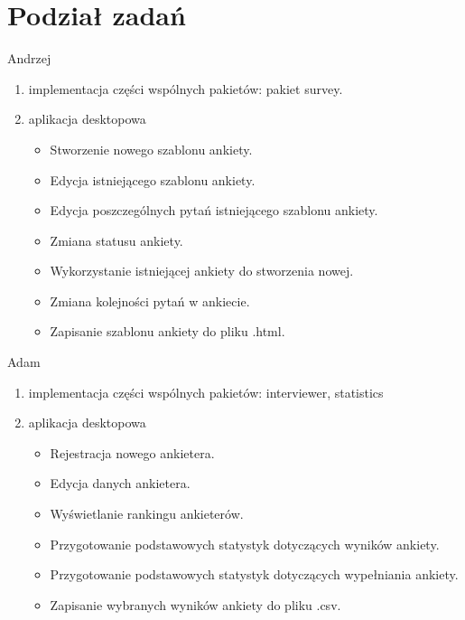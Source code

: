 \documentclass[a4paper,10pt]{beamer}
\begin{document}
		\section{Podział zadań}
		
		\begin{frame}{Andrzej}
			\begin{enumerate}
				\item	implementacja części wspólnych pakietów: pakiet survey.
				\item	aplikacja desktopowa
				\begin{itemize}
					\item  	Stworzenie nowego szablonu ankiety. 
						\item	Edycja istniejącego szablonu ankiety.
						\item	Edycja poszczególnych pytań istniejącego szablonu ankiety.
						\item	Zmiana statusu ankiety.
						\item	Wykorzystanie istniejącej ankiety do stworzenia nowej.
						\item	Zmiana kolejności pytań w ankiecie.
						\item	Zapisanie szablonu ankiety do pliku .html.
				\end{itemize}
			\end{enumerate}
		\end{frame}
		
		\begin{frame}{Adam}
			\begin{enumerate}
				\item	implementacja części wspólnych pakietów: interviewer, statistics
				\item	aplikacja desktopowa	
				\begin{itemize}
					\item Rejestracja nowego ankietera.
					\item	Edycja danych ankietera.
					\item	Wyświetlanie rankingu ankieterów.
					\item	Przygotowanie podstawowych statystyk dotyczących wyników ankiety.
					\item	Przygotowanie podstawowych statystyk dotyczących wypełniania ankiety.
					\item	Zapisanie wybranych wyników ankiety do pliku .csv.
				\end{itemize}
			\end{enumerate}
		\end{frame}
		
\end{document}

